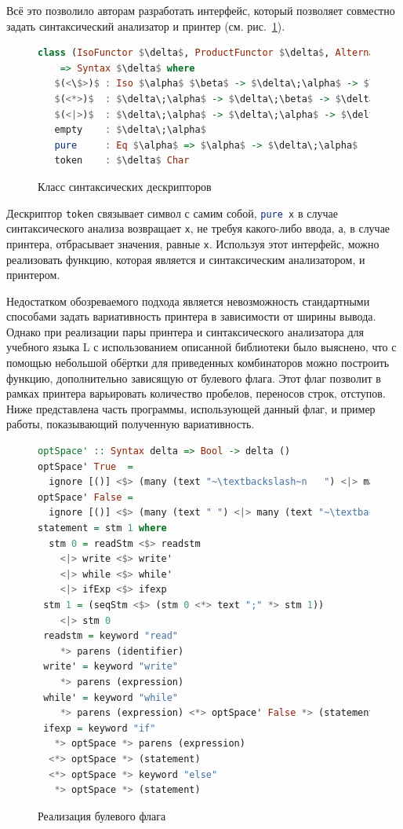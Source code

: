 Всё это позволило авторам разработать интерфейс, который позволяет совместно задать синтаксический анализатор и принтер (см. рис.~\ref{ClassSyntDesc}).

\begin{figure}[ht]
\centering
\begin{lstlisting}[mathescape,language = haskell]
class (IsoFunctor $\delta$, ProductFunctor $\delta$, Alternative $\delta$) 
    => Syntax $\delta$ where
   $(<\$>)$ : Iso $\alpha$ $\beta$ -> $\delta\;\alpha$ -> $\delta\;\beta$
   $(<*>)$  : $\delta\;\alpha$ -> $\delta\;\beta$ -> $\delta$ ($\alpha$, $\beta$)
   $(<|>)$  : $\delta\;\alpha$ -> $\delta\;\alpha$ -> $\delta\;\alpha$
   empty    : $\delta\;\alpha$
   pure     : Eq $\alpha$ => $\alpha$ -> $\delta\;\alpha$
   token    : $\delta$ Char
\end{lstlisting}
\caption{Класс синтаксических дескрипторов}
\label{ClassSyntDesc}
\end{figure}

Дескриптор \lstinline[language=Haskell]{token} связывает символ с самим собой, \lstinline[language=Haskell]{pure x} 
в случае синтаксического анализа возвращает \lstinline[language=Haskell]{x}, не требуя какого-либо ввода, а, в случае 
принтера, отбрасывает значения, равные \lstinline[language=Haskell]{x}. Используя этот интерфейс, можно 
реализовать функцию, которая является и синтаксическим анализатором, и принтером.

Недостатком обозреваемого подхода является невозможность стандартными способами задать 
вариативность принтера в зависимости от ширины вывода. 
Однако при реализации пары принтера и синтаксического анализатора для учебного языка L с использованием
описанной библиотеки было выяснено, что с помощью небольшой обёртки для приведенных
комбинаторов можно построить функцию, дополнительно зависящую от 
булевого флага. Этот флаг позволит в рамках принтера варьировать количество пробелов, переносов строк, отступов.
Ниже представлена часть программы, использующей данный флаг, и пример работы, показывающий
полученную вариативность.

\begin{figure}[ht]
\centering
\begin{lstlisting}[language=Haskell]
optSpace' :: Syntax delta => Bool -> delta ()
optSpace' True  = 
  ignore [()] <$> (many (text "~\textbackslash~n   ") <|> many (text " "))
optSpace' False = 
  ignore [()] <$> (many (text " ") <|> many (text "~\textbackslash~n"))
statement = stm 1 where
  stm 0 = readStm <$> readstm
    <|> write <$> write'
    <|> while <$> while'
    <|> ifExp <$> ifexp
 stm 1 = (seqStm <$> (stm 0 <*> text ";" *> stm 1))
    <|> stm 0
 readstm = keyword "read"
    *> parens (identifier)
 write' = keyword "write"		  
    *> parens (expression)
 while' = keyword "while"
    *> parens (expression) <*> optSpace' False *> (statement)
 ifexp = keyword "if"
   *> optSpace *> parens (expression)
  <*> optSpace *> (statement) 
  <*> optSpace *> keyword "else"  
   *> optSpace *> (statement)	
\end{lstlisting}
\caption{Реализация булевого флага}
\label{boolFlag1}
\end{figure}

